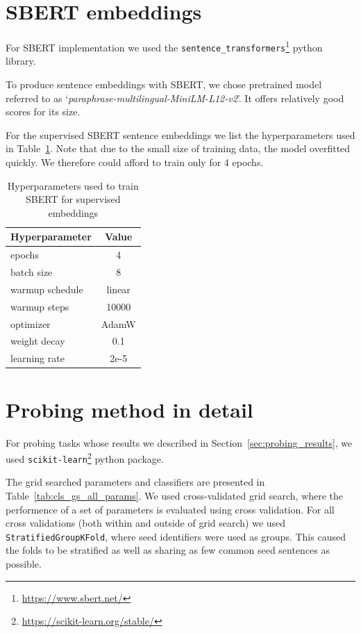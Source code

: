 \documentclass[11pt]{article}
\begin{document}
\section{SBERT embeddings}\label{appendix:sbert_embeddings}

For SBERT implementation we used the
\texttt{sentence\_transformers}\footnote{\url{https://www.sbert.net/}} python
library.

To produce sentence embeddings with SBERT, we chose pretrained model referred
to as `\textit{paraphrase-multilingual-MiniLM-L12-v2}'. It offers relatively
good scores for its size.

For the supervised SBERT sentence embeddings we list the hyperparameters used
in Table~\ref{tab:sbert_supervised_hparams}. Note that due to the small size of
training data, the model overfitted quickly. We therefore could afford to train
only for 4 epochs.

\begin{table}[htp]
  \centering
  \begin{tabular}{l c}
    \toprule
    Hyperparameter & Value\\
    \midrule
    epochs & 4 \\
    batch size & 8 \\
    warmup schedule & linear \\
    warmup steps & 10000 \\
    optimizer & AdamW \\
    weight decay & 0.1 \\
    learning rate & 2e-5 \\
    \bottomrule
  \end{tabular}

  \caption{Hyperparameters used to train SBERT for supervised
  embeddings}\label{tab:sbert_supervised_hparams}

\end{table}

\section{Probing method in detail}\label{appendix:probing_method}

For probing tasks whose results we described in
Section~\ref{sec:probing_results}, we used
\texttt{scikit-learn}\footnote{\url{https://scikit-learn.org/stable/}} python
package.

The grid searched parameters and classifiers are presented in
Table~\ref{tab:cls_gs_all_params}. We used cross-validated grid search, where
the performence of a set of parameters is evaluated using cross validation. For
all cross validations (both within and outside of grid search) we used
\texttt{StratifiedGroupKFold}, where seed identifiers were used as groups. This
caused the folds to be stratified as well as sharing as few common seed
sentences as possible.
\end{document}
